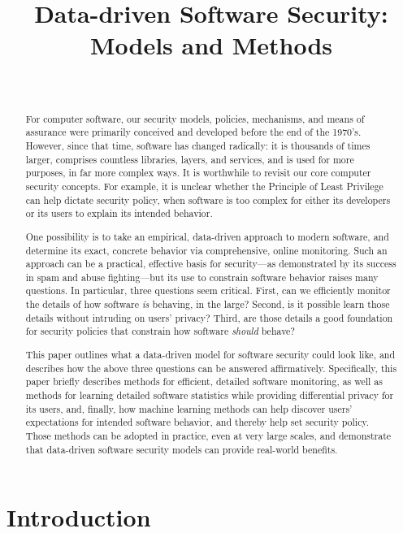 \documentclass{IEEEtran}
\title{Data-driven Software Security:\\ Models and Methods}
\author{}
\author{\IEEEauthorblockN{\'Ulfar Erlingsson}\\
\IEEEauthorblockA{Google, Inc.}}
\begin{document}
\maketitle

\begin{abstract}
For computer software, our security models, policies, mechanisms, and means of assurance were primarily conceived and developed before the end of the 1970's. However, since that time, software has changed radically: it is thousands of times larger, comprises countless libraries, layers, and services, and is used for more purposes, in far more complex ways. It is worthwhile to revisit our core computer security concepts. For example, it is unclear whether the Principle of Least Privilege can help dictate security policy, when software is too complex for either its developers or its users to explain its intended behavior.

One possibility is to take an empirical, data-driven approach to modern software, and determine its exact, concrete behavior via comprehensive, online monitoring. Such an approach can be a practical, effective basis for security---as demonstrated by its success in spam and abuse fighting---but its use to constrain software behavior raises many questions. In particular, three questions seem critical. First, can we efficiently monitor the details of how software \emph{is} behaving, in the large?  Second, is it possible learn those details without intruding on users' privacy?  Third, are those details a good foundation for security policies that constrain how software \emph{should} behave?  
    
This paper outlines what a data-driven model for software security could look like, and describes how the above three questions can be answered affirmatively. Specifically, this paper briefly describes methods for efficient, detailed software monitoring, as well as methods for learning detailed software statistics while providing differential privacy for its users, and, finally, how machine learning methods can help discover users' expectations for intended software behavior, and thereby help set security policy. Those methods can be adopted in practice, even at very large scales, and demonstrate that data-driven software security models can provide real-world benefits.
\end{abstract}

\section{Introduction}
\end{document}
